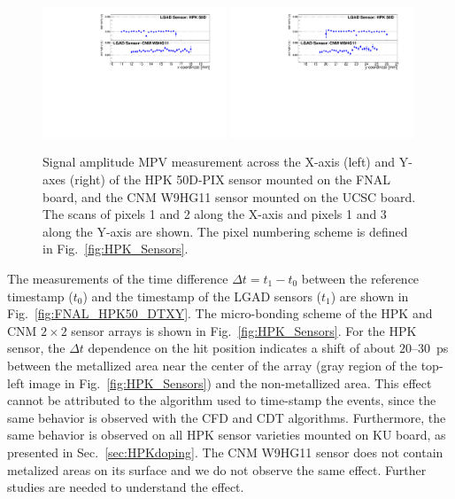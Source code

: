 \documentclass[preprint,1p]{elsarticle}
\begin{document}
\begin{figure}[htbp] 
\centering
\includegraphics[width=0.49\textwidth]{figs/HPK50DVsCNM_MPV_vs_X.pdf} 
\includegraphics[width=0.49\textwidth]{figs/HPK50DVsCNM_MPV_vs_Y.pdf} 
\caption{Signal amplitude MPV measurement across the X-axis (left) and Y-axes (right) of 
the HPK 50D-PIX sensor mounted on the FNAL board, and the CNM W9HG11 sensor mounted on 
the UCSC board. The scans of pixels 1 and 2 along the X-axis and pixels 1 and 3 
along the Y-axis are shown. The pixel numbering scheme is defined in Fig.~\ref{fig:HPK_Sensors}.} 
\label{fig:FNAL_HPK50_MPVXY} 
\end{figure} 


The measurements of the time difference $\Delta t = t_{1}-t_{0}$ between the
reference timestamp ($t_0$) and the timestamp of the LGAD sensors ($t_1$) are
shown in Fig.~\ref{fig:FNAL_HPK50_DTXY}. The micro-bonding scheme of the HPK and
CNM $2\times 2$ sensor arrays is shown in Fig.~\ref{fig:HPK_Sensors}. For the
HPK sensor, the $\Delta t$ dependence on the hit position indicates a shift of
about $20$--$30$~ps between the metallized area near the center of the array
(gray region of the top-left image in Fig.~\ref{fig:HPK_Sensors}) and the
non-metallized area. 
This effect cannot be attributed to the algorithm used to time-stamp the events,
since the same behavior is observed with the CFD and CDT algorithms.
Furthermore, the same behavior is observed on all HPK sensor varieties mounted
on KU board, as presented in Sec.~\ref{sec:HPKdoping}.  The CNM W9HG11 sensor
does not contain metalized areas on its surface and we do not observe the same effect. Further
studies are needed to understand the effect.
\end{document}
